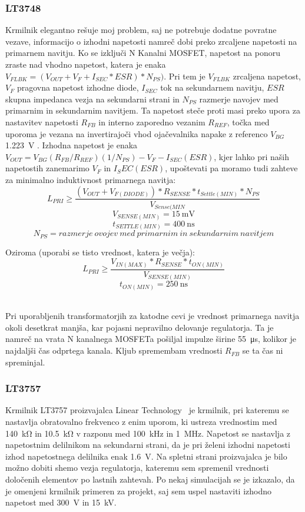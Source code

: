 \documentclass[a4paper,twoside,openright,12pt,Slovene]{book}
\begin{document}
	\subsubsection{LT3748} \label{LT3748}
Krmilnik elegantno rešuje moj problem, saj ne potrebuje dodatne povratne vezave, informacijo o izhodni napetosti namreč dobi preko zrcaljene napetosti na primarnem navitju. Ko se izključi N Kanalni MOSFET, napetost na ponoru zraste nad vhodno napetost, katera je enaka \(V_{FLBK} = (V_{OUT} + V_F + I_{SEC} * ESR) * N_{PS}) \). Pri tem je \(V_{FLBK}\) zrcaljena napetost, \(V_F\) pragovna napetost izhodne diode, \(I_{SEC}\) tok na sekundarnem navitju, \(ESR\) skupna impedanca vezja na sekundarni strani in \(N_{PS}\) razmerje navojev med primarnim in sekundarnim navitjem. Ta napetost steče proti masi preko upora za nastavitev napetosti \(R_{FB}\) in interno zaporedno vezanim \(R_{REF}\), točka med uporoma je vezana na invertirajoči vhod ojačevalnika napake z referenco \(V_{BG}\) \SI{1,223}{\volt} \cite{analog:LT3748}. Izhodna napetost je enaka \(V_{OUT} = V_{BG}(R_{FB} / R_{REF})(1 / N_{PS}) - V_F - I_{SEC} (ESR)\), kjer lahko pri naših napetostih zanemarimo \(V_F\) in \(I_SEC (ESR)\), upoštevati pa moramo tudi zahteve za minimalno induktivnost primarnega navitja:
\[L_{PRI} \geq \frac{(V_{OUT}+V_{F(DIODE)}) * R_{SENSE} * t_{Settle(MIN)} * N_{PS}}{V_{Sense(MIN}}\]
\[V_{SENSE(MIN)}=\SI{15}{\milli\volt}\]
\[t_{SETTLE(MIN)}=\SI{400}{\nano\second}\]
\[N_{PS}=razmerje \: ovojev \: med \: primarnim \: in \: sekundarnim \: navitjem \]

Oziroma (uporabi se tisto vrednost, katera je večja):
\[L_{PRI} \geq \frac{V_{IN(MAX)}*R_{SENSE}*t_{ON(MIN)}}{V_{SENSE(MIN)}}\]
\[t_{ON(MIN)}=\SI{250}{\nano\second}\]

~\\Pri uporabljenih transformatorjih za katodne cevi je vrednost primarnega navitja okoli desetkrat manjša, kar pojasni nepravilno delovanje regulatorja. Ta je namreč na vrata N kanalnega MOSFETa pošiljal impulze širine \SI{55}{\micro\second}, kolikor je najdaljši čas odprtega kanala. Kljub spremembam vrednosti \(R_{FB}\) se ta čas ni spreminjal.

	\subsubsection{LT3757} \label{LT3757}
Krmilnik LT3757 proizvajalca Linear Technology~\cite{analog:LT3757} je krmilnik, pri kateremu se nastavlja obratovalno frekvenco z enim uporom, ki ustreza vrednostim med \SI{140}{\kilo\ohm} in \SI{10.5}{\kilo\ohm} v razponu med \SI{100} {\kilo\hertz} in \SI{1} {\mega\hertz}. Napetost se nastavlja z napetostnim delilnikom na sekundarni strani, da je pri želeni izhodni napetosti izhod napetostnega delilnika enak \SI{1,6} {\volt}. Na spletni strani proizvajalca je bilo možno dobiti shemo vezja regulatorja, kateremu sem spremenil vrednosti določenih elementov po lastnih zahtevah. Po nekaj simulacijah se je izkazalo, da je omenjeni krmilnik primeren za projekt, saj sem uspel nastaviti izhodno napetost med \SI{300}{\volt} in \SI{15}{\kilo\volt}. 
\end{document}
